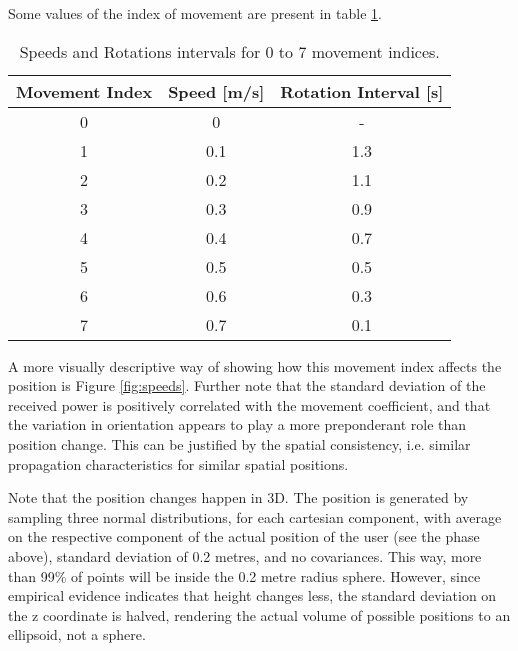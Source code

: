 Some values of the index of movement are present in table \ref{tab:head_speeds}.

\begin{table}[htp]
    \centering
    \caption{Speeds and Rotations intervals for 0 to 7 movement indices.}
    \label{tab:head_speeds}
    \begin{tabular}{|c|c|c|}
    \hline
    Movement Index & Speed {[}m/s{]} & Rotation Interval {[}s{]} \\ \hline
    0              & 0               & -                         \\ \hline
    1              & 0.1             & 1.3                       \\ \hline
    2              & 0.2             & 1.1                       \\ \hline
    3              & 0.3             & 0.9                       \\ \hline
    4              & 0.4             & 0.7                       \\ \hline
    5              & 0.5             & 0.5                       \\ \hline
    6              & 0.6             & 0.3                       \\ \hline
    7              & 0.7             & 0.1                       \\ \hline
    \end{tabular}
\end{table}


A more visually descriptive way of showing how this movement index affects the position is Figure \ref{fig:speeds}. Further note that the standard deviation of the received power is positively correlated with the movement coefficient, and that the variation in orientation appears to play a more preponderant role than position change. This can be justified by the spatial consistency, i.e. similar propagation characteristics for similar spatial positions.



Note that the position changes happen in 3D. The position is generated by sampling three normal distributions, for each cartesian component, with average on the respective component of the actual position of the user (see the phase above), standard deviation of 0.2 metres, and no covariances. This way, more than 99\% of points will be inside the 0.2 metre radius sphere. However, since empirical evidence indicates that height changes less, the standard deviation on the z coordinate is halved, rendering the actual volume of possible positions to an ellipsoid, not a sphere.


